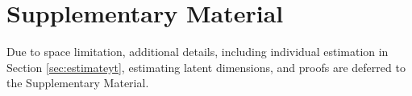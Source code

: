 \documentclass[12pt]{article}
\newcommand{\mytrans}{\top}
\begin{document}





 





\vspace{-1em}
\section*{Supplementary Material}
Due to space limitation, additional details, including individual estimation in Section \ref{sec:estimateyt}, estimating latent dimensions, and proofs are deferred to the Supplementary Material.

% 

\begin{spacing}{1.5}
    
\end{spacing}
\end{document}
